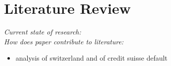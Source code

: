\chapter{Literature Review}\label{sec3}
\thispagestyle{empty}

\textit{Current state of research:}\\

\noindent
\textit{How does paper contribute to literature:}

\begin{itemize}
	\item analysis of switzerland and of credit suisse default
\end{itemize}

\cleardoublepage
